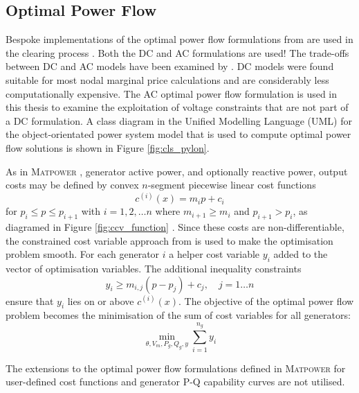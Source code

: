 \subsection{Optimal Power Flow}
Bespoke implementations of the optimal power flow formulations from \matpower
are used in the clearing process \cite[\S5]{pserc:mp_manual}.
Both the DC and AC formulations are used!  The trade-offs between DC and AC
models have been examined by .  DC models were found suitable for most nodal marginal
price calculations and are considerably less computationally expensive.  The
AC optimal power flow formulation is used in this thesis to examine the
exploitation of voltage constraints that are not part of a DC formulation.
A class diagram in the Unified Modelling Language (UML) for the
object-orientated power system model that is used to compute optimal power
flow solutions is shown in Figure \ref{fig:cls_pylon}.


As in \textsc{Matpower} \cite[p.26]{pserc:mp_manual}, generator active
power, and optionally reactive power, output costs may be defined by convex
$n$-segment piecewise linear cost functions
\begin{equation}
c^{(i)}(x) = m_ip + c_i
\end{equation}
for $p_i \leq p \leq p_{i+1}$ with $i = 1,2,\dotsc n$ where $m_{i+1} \geq m_i$
and $p_{i+1} > p_i$, as diagramed in Figure \ref{fig:ccv_function}
\cite[Figure5-3]{pserc:mp_manual}. Since these costs are non-differentiable,
the constrained cost variable approach from \cite{zimmerman:ccv} is used to
make the optimisation problem smooth.  For each generator $i$ a helper cost
variable $y_i$ added to the vector of optimisation variables.  The additional
inequality constraints
\begin{equation}
y_i \geq m_{i,j}(p-p_j) + c_j, \quad j = 1\dotsc n
\end{equation}
ensure that $y_i$ lies on or above $c^{(i)}(x)$. The
objective of the optimal power flow problem becomes the minimisation of the
sum of cost variables for all generators:
\begin{equation}
\min_{\theta, V_m, P_g, Q_g, y} \sum_{i=1}^{n_g}y_i
\end{equation}

The extensions to the optimal power flow formulations defined in
\textsc{Matpower} for user-defined cost functions and generator P-Q capability
curves are not utilised.

